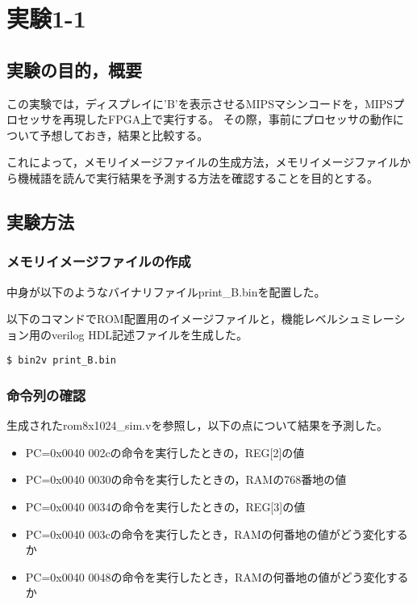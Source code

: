
\section{実験1-1}
\subsection{実験の目的，概要}
この実験では，ディスプレイに'B'を表示させるMIPSマシンコードを，MIPSプロセッサを再現したFPGA上で実行する。
その際，事前にプロセッサの動作について予想しておき，結果と比較する。

これによって，メモリイメージファイルの生成方法，メモリイメージファイルから機械語を読んで実行結果を予測する方法を確認することを目的とする。

\subsection{実験方法}
\subsubsection{メモリイメージファイルの作成}
中身が以下のようなバイナリファイルprint\_B.binを配置した。


以下のコマンドでROM配置用のイメージファイルと，機能レベルシュミレーション用のverilog HDL記述ファイルを生成した。
\begin{lstlisting}[caption={イメージファイルの作成},label={イメージファイルの作成1-1}]
  $ bin2v print_B.bin
\end{lstlisting}

\subsubsection{命令列の確認}
生成されたrom8x1024\_sim.vを参照し，以下の点について結果を予測した。
\begin{itemize}
  \item PC=0x0040 002cの命令を実行したときの，REG[2]の値
  \item PC=0x0040 0030の命令を実行したときの，RAMの768番地の値
  \item PC=0x0040 0034の命令を実行したときの，REG[3]の値
  \item PC=0x0040 003cの命令を実行したとき，RAMの何番地の値がどう変化するか
  \item PC=0x0040 0048の命令を実行したとき，RAMの何番地の値がどう変化するか
\end{itemize}

